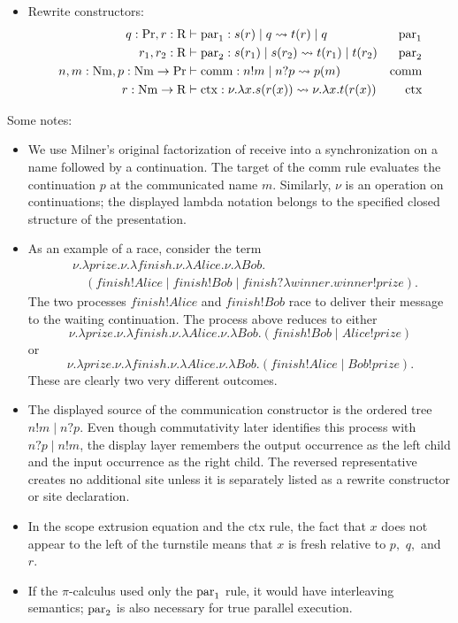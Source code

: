 \documentclass[11pt]{article}
\newcommand{\Proc}{\mathrm{Pr}}
\newcommand{\Rew}{\mathrm{R}}
\newcommand{\Nm}{\mathrm{Nm}}
\newcommand{\rw}{\rightsquigarrow}
\begin{document}
\begin{itemize}
    \item Rewrite constructors:
    \begin{align*}
        q: \Proc, r: \Rew & \vdash {\rm par}_1: s(r) \;|\; q \rw t(r) \;|\; q & \mbox{par}_1 \\
        r_1, r_2: \Rew & \vdash {\rm par}_2: s(r_1) \;|\; s(r_2) \rw t(r_1) \;|\; t(r_2) & \mbox{par}_2\\
        n, m: \Nm, p: \Nm \to \Proc &\vdash {\rm comm}: n!m\;|\;n?p \rw p(m) & \mbox{comm} \\
        r:\Nm \to \Rew &\vdash {\rm ctx}: \nu.\lambda x.s(r(x)) \rw \nu.\lambda x.t(r(x)) & \mbox{ctx}
    \end{align*}
\end{itemize}

Some notes:
\begin{itemize}

    \item We use Milner's original factorization of receive into a synchronization on a name followed by a continuation.  The target of the comm rule evaluates the continuation \(p\) at the communicated name \(m\).  Similarly, \(\nu\) is an operation on continuations; the displayed lambda notation belongs to the specified closed structure of the presentation.

    \item As an example of a race, consider the term
    \begin{align*}
        &\nu.\lambda prize.\nu.\lambda finish.\nu.\lambda Alice.\nu.\lambda Bob.\\
        &\quad(finish!Alice \;|\; finish!Bob \;|\; finish?\lambda winner.winner!prize).
    \end{align*}
    The two processes $finish!Alice$ and $finish!Bob$ race to deliver their message to the waiting continuation. The process above reduces to either
    \[
        \nu.\lambda prize.\nu.\lambda finish.\nu.\lambda Alice.\nu.\lambda Bob.(finish!Bob \;|\; Alice!prize)    
    \]
    or
    \[
        \nu.\lambda prize.\nu.\lambda finish.\nu.\lambda Alice.\nu.\lambda Bob.(finish!Alice \;|\; Bob!prize).
    \]
    These are clearly two very different outcomes.

    \item The displayed source of the communication constructor is the ordered tree \(n!m\;|\;n?p\).  Even though commutativity later identifies this process with \(n?p\;|\;n!m\), the display layer remembers the output occurrence as the left child and the input occurrence as the right child.  The reversed representative creates no additional site unless it is separately listed as a rewrite constructor or site declaration.

    \item In the scope extrusion equation and the ctx rule, the fact that $x$ does not appear to the left of the turnstile means that $x$ is fresh relative to $p,$ $q,$ and $r.$
    
    \item If the \(\pi\)-calculus used only the \({\rm par}_1\) rule, it would have interleaving semantics; \({\rm par}_2\) is also necessary for true parallel execution.
\end{itemize}
\end{document}
